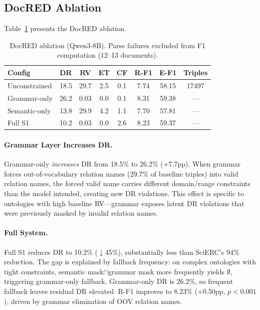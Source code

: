 \documentclass[11pt,a4paper]{article}
\begin{document}
\subsection{DocRED Ablation}
\label{sec:docred_ablation}

Table~\ref{tab:docred_ablation} presents the DocRED ablation.

\begin{table}[t]
\centering
\small
\caption{DocRED ablation (Qwen3-8B). Parse failures excluded from F1 computation (12--13 documents).}
\label{tab:docred_ablation}
\begin{tabular}{lccccccc}
\toprule
\textbf{Config} & \textbf{DR} & \textbf{RV} & \textbf{ET} & \textbf{CF} & \textbf{R-F1} & \textbf{E-F1} & \textbf{Triples} \\
\midrule
Unconstrained   & 18.5 & 29.7 & 2.5 & 0.1 & 7.74 & 58.15 & 17497 \\
Grammar-only    & 26.2 & 0.03 & 0.0 & 0.1 & 8.31 & 59.38 & --- \\
Semantic-only   & 13.8 & 29.9 & 4.2 & 1.1 & 7.70 & 57.81 & --- \\
Full S1         & 10.2 & 0.03 & 0.0 & 2.6 & 8.23 & 59.37 & --- \\
\bottomrule
\end{tabular}
\end{table}

\paragraph{Grammar Layer Increases DR.}
Grammar-only \emph{increases} DR from 18.5\% to 26.2\% (+7.7pp). When grammar forces out-of-vocabulary relation names (29.7\% of baseline triples) into valid relation names, the forced valid name carries different domain/range constraints than the model intended, creating new DR violations. This effect is specific to ontologies with high baseline RV---grammar exposes latent DR violations that were previously masked by invalid relation names.

\paragraph{Full System.}
Full S1 reduces DR to 10.2\% ($\downarrow$45\%), substantially less than SciERC's 94\% reduction. The gap is explained by fallback frequency: on complex ontologies with tight constraints, semantic mask$\cap$grammar mask more frequently yields $\emptyset$, triggering grammar-only fallback. Grammar-only DR is 26.2\%, so frequent fallback leaves residual DR elevated. R-F1 improves to 8.23\% (+0.50pp, $p{<}0.001$), driven by grammar elimination of OOV relation names.
\end{document}
